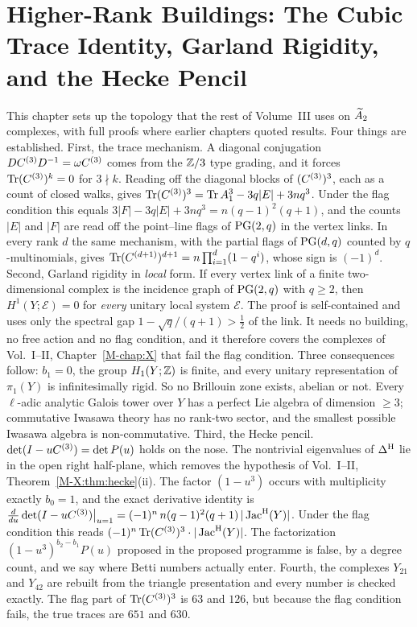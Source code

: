 \chapter{Higher-Rank Buildings: The Cubic Trace Identity, Garland Rigidity, and the Hecke Pencil}\label{chap:V3P1}
\begin{chapterabstract}
This chapter sets up the topology that the rest of Volume~III uses on $\widetilde A_2$ complexes, with
full proofs where earlier chapters quoted results. Four things are established. First, the
trace mechanism. A diagonal conjugation $DC^{(3)} D^{-1}=\omega C^{(3)}$ comes from the $\mathbb{Z}/3$
type grading, and it forces $\operatorname{Tr}(C^{(3)})^{k}=0$ for $3\nmid k$. Reading off the diagonal
blocks of $(C^{(3)})^{3}$, each as a count of closed walks, gives
$\operatorname{Tr}(C^{(3)})^{3}=\operatorname{Tr} A_1^{3}-3q|E|+3nq^{3}$. Under the flag condition this equals
$3|F|-3q|E|+3nq^{3}=n(q-1)^{2}(q+1)$, and the counts $|E|$ and $|F|$ are read off the
point--line flags of $\mathrm{PG}(2,q)$ in the vertex links. In every rank $d$ the same mechanism, with the
partial flags of $\mathrm{PG}(d,q)$ counted by $q$-multinomials, gives
$\operatorname{Tr}(C^{(d+1)})^{d+1}=n\prod_{i=1}^{d}(1-q^{i})$, whose sign is $(-1)^{d}$. Second, Garland rigidity in \emph{local}
form. If every vertex link of a finite two-dimensional complex is the incidence graph of
$\mathrm{PG}(2,q)$ with $q\ge2$, then $H^{1}(Y;\mathcal E)=0$ for \emph{every} unitary local system
$\mathcal E$. The proof is self-contained and uses only the spectral gap
$1-\sqrt q/(q+1)>\tfrac12$ of the link. It needs no building, no free action and no flag
condition, and it therefore covers the complexes of Vol.~I--II, Chapter~\ref{M-chap:X} that fail the flag
condition. Three consequences follow: $b_1=0$, the group $H_1(Y;\mathbb{Z})$ is finite, and every
unitary representation of $\pi_1(Y)$ is infinitesimally rigid. So no Brillouin zone exists,
abelian or not. Every $\ell$-adic analytic Galois tower over $Y$ has a perfect Lie algebra of
dimension $\ge3$; commutative Iwasawa theory has no rank-two sector, and the smallest possible
Iwasawa algebra is non-commutative. Third, the Hecke pencil. $\det(I-uC^{(3)})=\det P(u)$
holds on the nose. The nontrivial eigenvalues of $\Delta^{\mathrm{H}}$ lie in the open right half-plane,
which removes the hypothesis of Vol.~I--II, Theorem~\ref{M-X:thm:hecke}(ii). The factor $(1-u^{3})$ occurs
with multiplicity exactly $b_0=1$, and the exact derivative identity is
$\frac{d}{du}\det(I-uC^{(3)})\big|_{u=1}=(-1)^{n}\,n(q-1)^{2}(q+1)\,|\operatorname{Jac}^{\mathrm{H}}(Y)|$. Under the flag
condition this reads $(-1)^{n}\operatorname{Tr}(C^{(3)})^{3}\cdot|\operatorname{Jac}^{\mathrm{H}}(Y)|$. The factorization
$(1-u^{3})^{b_2-b_1}P(u)$ proposed in the proposed programme is false, by a degree count, and we
say where Betti numbers actually enter. Fourth, the complexes $Y_{21}$ and $Y_{42}$ are
rebuilt from the triangle presentation and every number is checked exactly. The flag part of
$\operatorname{Tr}(C^{(3)})^{3}$ is $63$ and $126$, but because the flag condition fails, the true traces
are $651$ and $630$.
\end{chapterabstract}

